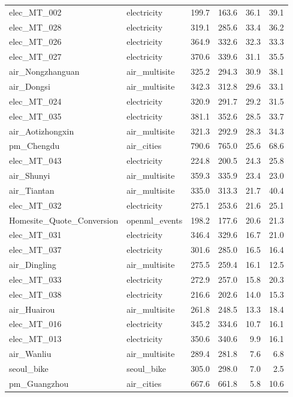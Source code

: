 \begin{longtable}{@{}l l r r r r@{}}
elec\_MT\_002 & electricity & 199.7 & 163.6 & 36.1 & 39.1 \\
elec\_MT\_028 & electricity & 319.1 & 285.6 & 33.4 & 36.2 \\
elec\_MT\_026 & electricity & 364.9 & 332.6 & 32.3 & 33.3 \\
elec\_MT\_027 & electricity & 370.6 & 339.6 & 31.1 & 35.5 \\
air\_Nongzhanguan & air\_multisite & 325.2 & 294.3 & 30.9 & 38.1 \\
air\_Dongsi & air\_multisite & 342.3 & 312.8 & 29.6 & 33.1 \\
elec\_MT\_024 & electricity & 320.9 & 291.7 & 29.2 & 31.5 \\
elec\_MT\_035 & electricity & 381.1 & 352.6 & 28.5 & 33.7 \\
air\_Aotizhongxin & air\_multisite & 321.3 & 292.9 & 28.3 & 34.3 \\
pm\_Chengdu & air\_cities & 790.6 & 765.0 & 25.6 & 68.6 \\
elec\_MT\_043 & electricity & 224.8 & 200.5 & 24.3 & 25.8 \\
air\_Shunyi & air\_multisite & 359.3 & 335.9 & 23.4 & 23.0 \\
air\_Tiantan & air\_multisite & 335.0 & 313.3 & 21.7 & 40.4 \\
elec\_MT\_032 & electricity & 275.1 & 253.6 & 21.6 & 25.1 \\
Homesite\_Quote\_Conversion & openml\_events & 198.2 & 177.6 & 20.6 & 21.3 \\
elec\_MT\_031 & electricity & 346.4 & 329.6 & 16.7 & 21.0 \\
elec\_MT\_037 & electricity & 301.6 & 285.0 & 16.5 & 16.4 \\
air\_Dingling & air\_multisite & 275.5 & 259.4 & 16.1 & 12.5 \\
elec\_MT\_033 & electricity & 272.9 & 257.0 & 15.8 & 20.3 \\
elec\_MT\_038 & electricity & 216.6 & 202.6 & 14.0 & 15.3 \\
air\_Huairou & air\_multisite & 261.8 & 248.5 & 13.3 & 18.4 \\
elec\_MT\_016 & electricity & 345.2 & 334.6 & 10.7 & 16.1 \\
elec\_MT\_013 & electricity & 350.6 & 340.6 & 9.9 & 16.1 \\
air\_Wanliu & air\_multisite & 289.4 & 281.8 & 7.6 & 6.8 \\
seoul\_bike & seoul\_bike & 305.0 & 298.0 & 7.0 & 2.5 \\
pm\_Guangzhou & air\_cities & 667.6 & 661.8 & 5.8 & 10.6 \\

\end{longtable}
